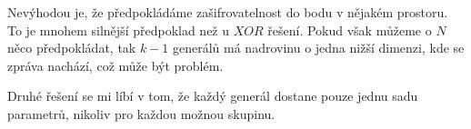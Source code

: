 \documentclass[a4paper]{article}
\begin{document}
Nevýhodou je, že předpokládáme zašifrovatelnost do bodu v nějakém prostoru. To je mnohem silnější předpoklad než u $XOR$ řešení. Pokud však můžeme o $N$ něco předpokládat, tak $k-1$ generálů má nadrovinu o jedna nižší dimenzi, kde se zpráva nachází, což může být problém.

Druhé řešení se mi líbí v tom, že každý generál dostane pouze jednu sadu parametrů, nikoliv pro každou možnou skupinu.
\end{document}
